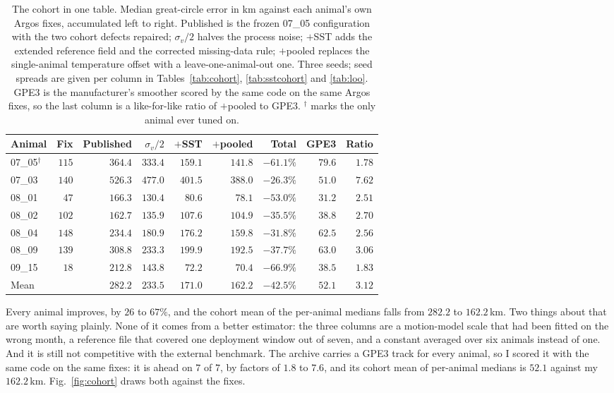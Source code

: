 \documentclass[conference]{IEEEtran}
\begin{document}
\begin{table}[t]
\caption{The cohort in one table. Median great-circle error in \si{\km}
against each animal's own Argos fixes, accumulated left to right. Published is
the frozen 07\_05 configuration with the two cohort defects repaired;
$\sigma_v/2$ halves the process noise; $+$SST adds the extended reference field
and the corrected missing-data rule; $+$pooled replaces the single-animal
temperature offset with a leave-one-animal-out one. Three seeds; seed spreads
are given per column in Tables~\ref{tab:cohort}, \ref{tab:sstcohort} and
\ref{tab:loo}. GPE3 is the manufacturer's smoother scored by the same code on
the same Argos fixes, so the last column is a like-for-like ratio of $+$pooled to
GPE3. $^{\dagger}$ marks the only animal ever tuned on.}
\label{tab:cohortsum}
\centering
\footnotesize
\begin{tabular}{@{}lrrrrrrrr@{}}
\toprule
Animal & Fix & Published & $\sigma_v/2$ & $+$SST & $+$pooled & Total & GPE3 & Ratio \\
\midrule
07\_05$^{\dagger}$ & $115$ & $364.4$ & $333.4$ & $159.1$ & $141.8$ & $-61.1\%$ & $79.6$ & $1.78$ \\
07\_03             & $140$ & $526.3$ & $477.0$ & $401.5$ & $388.0$ & $-26.3\%$ & $51.0$ & $7.62$ \\
08\_01             & $47$  & $166.3$ & $130.4$ & $80.6$  & $78.1$  & $-53.0\%$ & $31.2$ & $2.51$ \\
08\_02             & $102$ & $162.7$ & $135.9$ & $107.6$ & $104.9$ & $-35.5\%$ & $38.8$ & $2.70$ \\
08\_04             & $148$ & $234.4$ & $180.9$ & $176.2$ & $159.8$ & $-31.8\%$ & $62.5$ & $2.56$ \\
08\_09             & $139$ & $308.8$ & $233.3$ & $199.9$ & $192.5$ & $-37.7\%$ & $63.0$ & $3.06$ \\
09\_15             & $18$  & $212.8$ & $143.8$ & $72.2$  & $70.4$  & $-66.9\%$ & $38.5$ & $1.83$ \\
\midrule
Mean               &       & $282.2$ & $233.5$ & $171.0$ & $162.2$ & $-42.5\%$ & $52.1$ & $3.12$ \\
\bottomrule
\end{tabular}
\end{table}

Every animal improves, by $26$ to $67\%$, and the cohort mean of the
per-animal medians falls from $282.2$ to $162.2$\,\si{\km}. Two things about
that are worth saying plainly. None of it comes from a better estimator: the
three columns are a motion-model scale that had been fitted on the wrong
month, a reference file that covered one deployment window out of seven, and a
constant averaged over six animals instead of one. And it is still not
competitive with the external benchmark. The archive carries a GPE3 track for
every animal, so I scored it with the same code on the same fixes: it is ahead
on $7$ of $7$, by factors of $1.8$ to $7.6$, and its cohort mean of per-animal
medians is $52.1$ against my $162.2$\,\si{\km}. Fig.~\ref{fig:cohort} draws
both against the fixes.
\end{document}
